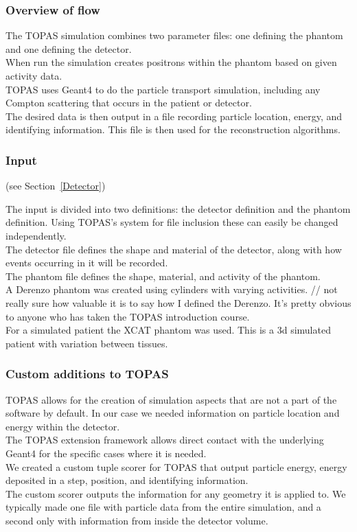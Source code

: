 \documentclass[12pt]{article}
\begin{document}
\subsubsection{Overview of flow}
The TOPAS simulation combines two parameter files: one defining the phantom and one defining the detector. \\
When run the simulation creates positrons within the phantom based on given activity data. \\
TOPAS uses Geant4 to do the particle transport simulation, including any Compton scattering that occurs in the patient or detector. \\
The desired data is then output in a file recording particle location, energy, and identifying information. This file is then used for the reconstruction algorithms. \\

\subsubsection{Input}
 (see Section~\ref{Detector})

The input is divided into two definitions: the detector definition and the phantom definition. Using TOPAS’s system for file inclusion these can easily be changed independently.\\
The detector file defines the shape and material of the detector, along with how events occurring in it will be recorded.\\
The phantom file defines the shape, material, and activity of the phantom.\\
A Derenzo phantom was created using cylinders with varying activities. // not really sure how valuable it is to say how I defined the Derenzo. It’s pretty obvious to anyone who has taken the TOPAS introduction course.\\
For a simulated patient the XCAT phantom was used. This is a 3d simulated patient with variation between tissues.\\



\subsubsection{Custom additions to TOPAS}
TOPAS allows for the creation of simulation aspects that are not a part of the software by default. In our case we needed information on particle location and energy within the detector.\\
The TOPAS extension framework allows direct contact with the underlying Geant4 for the specific cases where it is needed.\\
We created a custom tuple scorer for TOPAS that output particle energy, energy deposited in a step, position, and identifying information.\\
The custom scorer outputs the information for any geometry it is applied to. We typically made one file with particle data from the entire simulation, and a second only with information from inside the detector volume.\\
\end{document}
